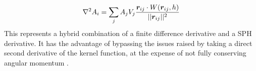 % 
\begin{equation} \label{eq:2nd_der_sph_II}
\nabla^2 {A}_i = \sum_j{A_j V_j \frac{\boldsymbol{r}_{ij}\cdot W(\boldsymbol{r}_{ij}, h)}{||\boldsymbol{r}_{ij}||^2}}
\end{equation}
%
This represents a hybrid combination of a finite difference derivative and a \ac{SPH} derivative. It has the advantage of bypassing the issues raised by taking a direct second derivative of the kernel function, at the expense of not fully conserving angular momentum \citep{Monaghan-2006}.

















